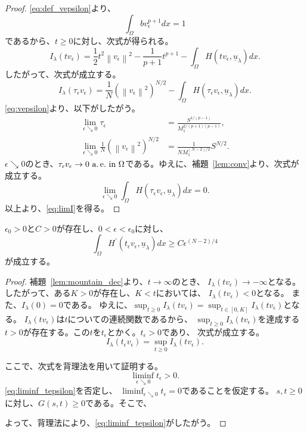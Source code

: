 \begin{proof}
 \eqref{eq:def_vepsilon}より、
 \[
  \int_\Omega bv_\epsilon^{p+1} dx = 1
 \]
 であるから、$t \geq 0$に対し、次式が得られる。
 \[
  I_\lambda(tv_\epsilon) = \frac{1}{2} t^2 \left\| v_\epsilon
 \right\|^2 - \frac{1}{p+1} t^{p+1} - \int_\Omega H(tv_\epsilon,
 \underline{u}_\lambda) dx.
 \]
 したがって、次式が成立する。
 \[
  I_\lambda(\tau_\epsilon v_\epsilon) = \frac{1}{N} \left( \left\|
 v_\epsilon \right\|^2 \right)^{N/2} - \int_\Omega H(\tau_\epsilon
 v_\epsilon, \underline{u}_\lambda) dx.
 \]
 \eqref{eq:vepsilon}より、以下がしたがう。
 \begin{align*}
  \lim_{\epsilon \searrow 0} \tau_\epsilon
  &= \frac{S^{1/(p-1)}}{M_1^{2/(p+1)(p-1)}}, \\
  \lim_{\epsilon \searrow 0} \frac{1}{N} \left( \left\|
 v_\epsilon \right\|^2 \right)^{N/2} &= \frac{1}{NM_1^{(N-2)/2}}
  S^{N/2}.
 \end{align*}
 $\epsilon \searrow 0$のとき、$\tau_\epsilon v_\epsilon \to 0 ~\text{a.\,e.}~
 \text{in}~ \Omega$である。ゆえに、補題~\ref{lem:conv}より、次式が成立する。
 \[
  \lim_{\epsilon \searrow 0} \int_\Omega H(\tau_\epsilon
 v_\epsilon, \underline{u}_\lambda) dx = 0.
 \]
 以上より、\eqref{eq:limI}を得る。\qedhere
\end{proof}

\begin{lem}
 $\epsilon_0 > 0$と$C > 0$が存在し、$0 < \epsilon < \epsilon_0$に対し、
 \begin{equation}
  \int_\Omega H^\prime(t_\epsilon v_\epsilon, \underline{u}_\lambda)
   dx \geq C\epsilon^{(N-2)/4} \label{eq:int_Hprime}
 \end{equation}
 が成立する。
\end{lem}

\begin{proof}
補題~\ref{lem:mountain_dec}より、$t \to \infty$のとき、
$I_\lambda(t v_\epsilon) \to -\infty$となる。
したがって、ある$K>0$が存在し、$K < t$においては、
$I_\lambda(t v_\epsilon) < 0$となる。
また、$I_\lambda(0) = 0$である。
ゆえに、$\sup_{t \geq 0} I_\lambda (tv_\epsilon) = 
\sup_{t \in [0, K]} I_\lambda (tv_\epsilon)$となる。
$I_\lambda(tv_\epsilon)$は$t$についての連続関数であるから、
$\sup_{t \geq 0} I_\lambda (tv_\epsilon)$を達成する
$t > 0$が存在する。この$t$を$t_\epsilon$とかく。$t_\epsilon > 0$であり、
次式が成立する。
\begin{equation}
 I_\lambda(t_\epsilon v_\epsilon) = \sup_{t \geq 0} I_\lambda(t
  v_\epsilon).
  \label{eq:t_epsilon}
\end{equation}

ここで、次式を背理法を用いて証明する。
\begin{equation}
 \liminf_{\epsilon \searrow 0} t_\epsilon > 0. \label{eq:liminf_tepsilon}
\end{equation}
\eqref{eq:liminf_tepsilon}を否定し、
$\liminf_{\epsilon \searrow 0} t_\epsilon = 0$であることを仮定する。
$s, t \geq 0$に対し、$G(s, t) \geq 0$である。そこで、

よって、背理法により、\eqref{eq:liminf_tepsilon}がしたがう。 
\end{proof}


